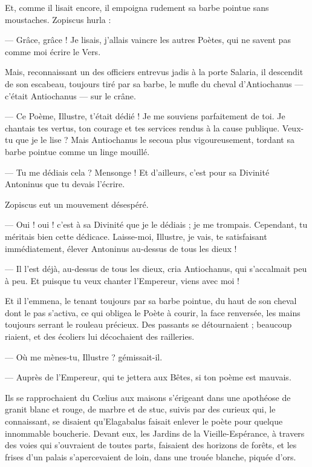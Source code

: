 \documentclass[a4paper, 11pt, oneside, polutonikogreek, french]{article}
\begin{document}
Et, comme il lisait encore, il empoigna rudement sa barbe pointue sans moustaches. Zopiscus hurla :

--- Grâce, grâce ! Je lisais, j'allais vaincre les autres Poètes, qui ne savent pas comme moi écrire le Vers.

Mais, reconnaissant un des officiers entrevus jadis à la porte Salaria, il descendit de son escabeau, toujours tiré par sa barbe, le mufle du cheval d'Antiochanus --- c'était Antiochanus --- sur le crâne.

--- Ce Poème, Illustre, t'était dédié ! Je me souviens parfaitement de toi. Je chantais tes vertus, ton courage et tes services rendus à la cause publique. Veux-tu que je le lise ? Mais Antiochanus le secoua plus vigoureusement, tordant sa barbe pointue comme un linge mouillé.

--- Tu me dédiais cela ? Mensonge ! Et d'ailleurs, c'est pour sa Divinité Antoninus que tu devais l'écrire.

Zopiscus eut un mouvement désespéré.

--- Oui ! oui ! c'est à sa Divinité que je le dédiais ; je me trompais. Cependant, tu méritais bien cette dédicace. Laisse-moi, Illustre, je vais, te satisfaisant immédiatement, élever Antoninus au-dessus de tous les dieux !

--- Il l'est déjà, au-dessus de tous les dieux, cria Antiochanus, qui s'accalmait peu à peu. Et puisque tu veux chanter l'Empereur, viens avec moi !

Et il l'emmena, le tenant toujours par sa barbe pointue, du haut de son cheval dont le pas s'activa, ce qui obligea le Poète à courir, la face renversée, les mains toujours serrant le rouleau précieux. Des passants se détournaient ; beaucoup riaient, et des écoliers lui décochaient des railleries.

--- Où me mènes-tu, Illustre ? gémissait-il.

--- Auprès de l'Empereur, qui te jettera aux Bêtes, si ton poème est mauvais.

Ils se rapprochaient du Cœlius aux maisons s'érigeant dans une apothéose de granit blanc et rouge, de marbre et de stuc, suivis par des curieux qui, le connaissant, se disaient qu'Elagabalus faisait enlever le poète pour quelque innommable boucherie. Devant eux, les Jardins de la Vieille-Espérance, à travers des voies qui s'ouvraient de toutes parts, faisaient des horizons de forêts, et les frises d'un palais s'apercevaient de loin, dans une trouée blanche, piquée d'ors.
\end{document}
